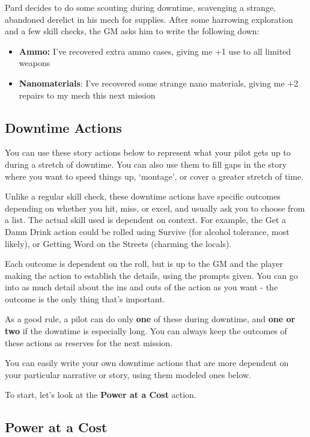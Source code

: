 Pard decides to do some scouting during downtime, scavenging a strange, abandoned derelict in his mech for supplies. After some harrowing exploration and a few skill checks, the GM asks him to write the following down:
\begin{itemize}
\item \textbf{Ammo:} I've recovered extra ammo cases, giving me +1 use to all limited weapons
\item \textbf{Nanomaterials}: I've recovered some strange nano materials, giving me +2 repairs to my mech this next mission
\end{itemize}  

\subsection{Downtime Actions}

You can use these story actions below to represent what your pilot gets up to during a stretch of downtime. You can also use them to fill gaps in the story where you want to speed things up, `montage', or cover a greater stretch of time. 

Unlike a regular skill check, these downtime actions have specific outcomes depending on whether you hit, miss, or excel, and usually ask you to choose from a list. The actual skill used is dependent on context. For example, the Get a Damn Drink action could be rolled using Survive (for alcohol tolerance, most likely), or Getting Word on the Streets (charming the locals). 

Each outcome is dependent on the roll, but is up to the GM and the player making the action to establish the details, using the prompts given. You can go into as much detail about the ins and outs of the action as you want - the outcome is the only thing that's important.

As a good rule, a pilot can do only \textbf{one} of these during downtime, and \textbf{one or two} if the downtime is especially long. You can always keep the outcomes of these actions as reserves for the next mission.

You can easily write your own downtime actions that are more dependent on your particular narrative or story, using them modeled ones below.

To start, let's look at the \textbf{Power at a Cost} action.

\subsection{Power at a Cost}

